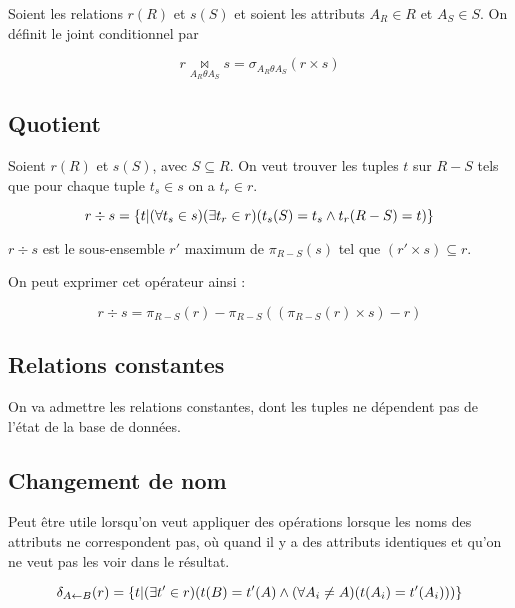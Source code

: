 		Soient les relations $r(R)$ et $s(S)$ et soient les attributs $A_R \in R$ et $A_S \in S$. On définit le joint conditionnel par
		
		$$r \underset{A_R \theta A_S}{\Join} s = \sigma_{A_R \theta A_S} (r \times s)$$
		
		
		\subsection{Quotient}
		
		Soient $r(R)$ et $s(S)$, avec $S \subseteq R$. On veut trouver les tuples $t$ sur $R - S$ tels que pour chaque tuple $t_s \in s$ on a $t_r \in r$.
		
		$$r \div s = \lbrace t \vert (\forall t_s \in s)(\exists t_r \in r) (t_s(S) = t_s \wedge t_r(R - S) = t) \rbrace $$
		
		$r \div s$ est le sous-ensemble $r'$ maximum de $\pi_{R - S}(s)$ tel que $(r' \times s ) \subseteq r$.
		
		On peut exprimer cet opérateur ainsi :
		
		$$ r \div s = \pi_{R - S} (r) - \pi_{R - S} ( (\pi_{R - S}(r) \times s ) - r ) $$
		
		\subsection{Relations constantes}
		
		On va admettre les relations constantes, dont les tuples ne dépendent pas de l'état de la base de données.
		
		\subsection{Changement de nom}
		
		Peut être utile lorsqu'on veut appliquer des opérations lorsque les noms des attributs ne correspondent pas, où quand il y a des attributs identiques et qu'on ne veut pas les voir dans le résultat.
		
		$$\delta_{A \leftarrow B}(r) = \lbrace  t \vert (\exists t' \in r)(t(B) = t'(A) \wedge (\forall A_i \neq A)(t(A_i) = t'(A_i)))  \rbrace$$